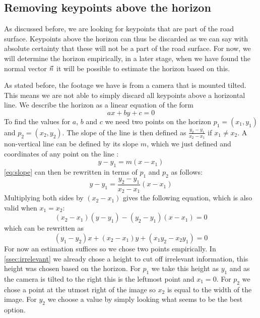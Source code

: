 \subsection{Removing keypoints above the horizon}\label{ssec:horizon}
As discussed before, we are looking for keypoints that are part of the road surface. Keypoints above the horizon can thus be discarded as we can say with absolute certainty that these will not be a part of the road surface. For now, we will determine the horizon empirically, in a later stage, when we have found the normal vector $\vec n$ it will be possible to estimate the horizon based on this.\bigskip

As stated before, the footage we have is from a camera that is mounted tilted. This means we are not able to simply discard all keypoints above a horizontal line. We describe the horizon as a linear equation of the form
\begin{equation}\label{eq:linear}
    ax + by + c = 0
\end{equation}
To find the values for $a$, $b$ and $c$ we need two points on the horizon $p_1 = (x_1, y_1)$ and $ p_2 = (x_2, y_2)$. The slope of the line is then defined as $\frac{y_2-y_1}{x_2-x_1}$ if $x_1 \neq x_2$. A non-vertical line can be defined by its slope $m$, which we just defined and coordinates of any point on the line \cite{wiki_linear}:
\begin{equation}\label{eq:slope}
    y - y_1 = m(x-x_1)
\end{equation}
\autoref{eq:slope} can then be rewritten in terms of $p_1$ and $p_2$ as follows:
\begin{equation}
    y - y_1 = \frac{y_2-y_1}{x_2-x_1}(x-x_1)
\end{equation}
Multiplying both sides by $(x_2-x_1)$ gives the following equation, which is also valid when $x_1 = x_2$:
\begin{equation}
    (x_2-x_1)(y-y_1) - (y_2-y_1)(x-x_1) = 0
\end{equation}
which can be rewritten as
\begin{equation}\label{eq:line}
    (y_1-y_2)x + (x_2-x_1)y + (x_1y_2-x_2y_1) = 0
\end{equation}
For now an estimation suffices so we chose two points empirically. In \autoref{ssec:irrelevant} we already chose a height to cut off irrelevant information, this height was chosen based on the horizon. For $p_1$ we take this height as $y_1$ and as the camera is tilted to the right this is the leftmost point and $x_1 = 0$. For $p_2$ we chose a point at the utmost right of the image so $x_2$ is equal to the width of the image. For $y_2$ we choose a value by simply looking what seems to be the best option. \bigskip


